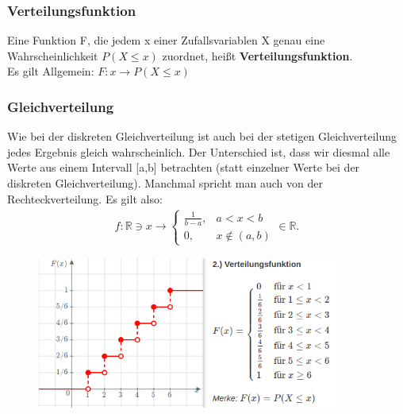 \documentclass[a4paper,10pt]{scrartcl}
\begin{document}
\subsubsection{Verteilungsfunktion}
Eine Funktion F, die jedem x einer Zufallsvariablen X genau eine Wahrscheinlichkeit $P(X \le x)$ zuordnet, heißt \textbf{Verteilungsfunktion}.\\
Es gilt Allgemein: $F: x \rightarrow P(X \le x)$

\subsubsection{Gleichverteilung}
Wie bei der diskreten Gleichverteilung ist auch bei der stetigen Gleichverteilung jedes Ergebnis gleich wahrscheinlich. Der Unterschied ist, dass wir diesmal alle Werte aus einem Intervall [a,b] betrachten (statt einzelner Werte bei der diskreten Gleichverteilung). Manchmal spricht man auch von der Rechteckverteilung. Es gilt also:
\begin{eqnarray*}
f:{\mathbb{R}}\ni x\to \left\{\begin{array}{rl}\frac{1}{b-a}, & a\lt x\lt b\\ 0, & x\notin(a,b)\end{array}\in {\mathbb{R}}.\right.
\end{eqnarray*}

\begin{figure}[h] 
  \centering
      \includegraphics[width=0.9\textwidth]{Verteilungsfunktion.png}
  \label{fig:Bild1}
\end{figure}
\newpage
\end{document}
